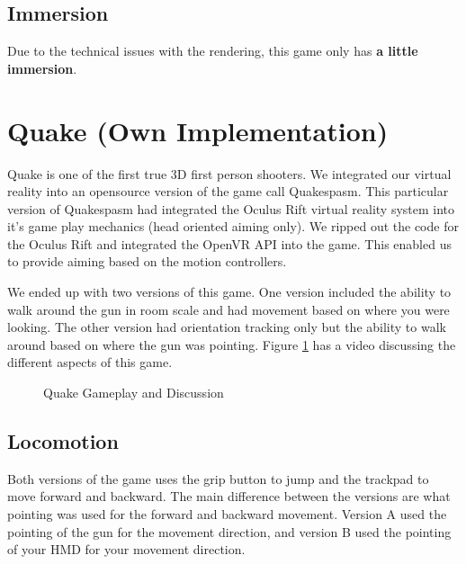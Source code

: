 \documentclass[journal]{IEEEtran}
\begin{document}
 
\subsection{Immersion}
Due to the technical issues with the rendering, this game only has \textbf{a little immersion}. 

\section{Quake (Own Implementation)}
Quake is one of the first true 3D first person shooters. We integrated our virtual reality into an opensource version of the game call Quakespasm. This particular version of Quakespasm had integrated the Oculus Rift virtual reality system into it's game play mechanics (head oriented aiming only). We ripped out the code for the Oculus Rift and integrated the OpenVR API into the game. This enabled us to provide aiming based on the motion controllers. 

We ended up with two versions of this game. One version included the ability to walk around the gun in room scale and had movement based on where you were looking. The other version had orientation tracking only but the ability to walk around based on where the gun was pointing. Figure \ref{Quake_Gameplay} has a video discussing the different aspects of this game.  

 
\begin{figure}[h]
	\centering
		\caption{Quake Gameplay and Discussion}
		\label{Quake_Gameplay}
\end{figure}

\subsection{Locomotion}
Both versions of the game uses the grip button to jump and the trackpad to move forward and backward. The main difference between the versions are what pointing was used for the forward and backward movement. Version A used the pointing of the gun for the movement direction, and version B used the pointing of your HMD for your movement direction. 
\end{document}
